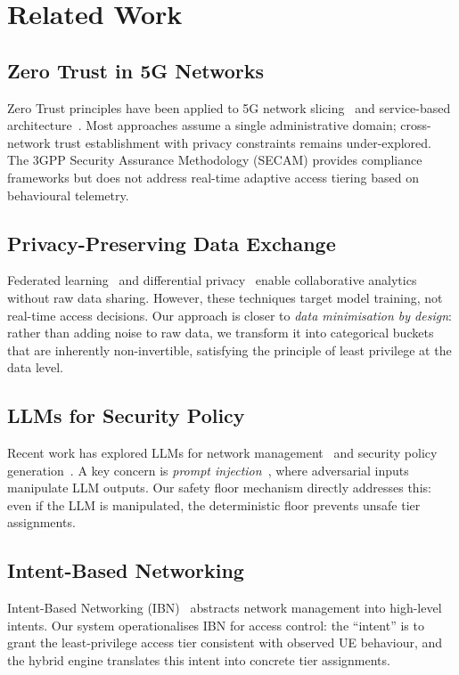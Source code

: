 \documentclass[conference]{IEEEtran}
\begin{document}
\section{Related Work}
\label{sec:related}

\subsection{Zero Trust in 5G Networks}
Zero Trust principles have been applied to 5G network slicing~\cite{benzaid2020ztasecurity} and service-based architecture~\cite{porambage2021roadmap}. Most approaches assume a single administrative domain; cross-network trust establishment with privacy constraints remains under-explored. The 3GPP Security Assurance Methodology (SECAM) provides compliance frameworks but does not address real-time adaptive access tiering based on behavioural telemetry.

\subsection{Privacy-Preserving Data Exchange}
Federated learning~\cite{mcmahan2017communication} and differential privacy~\cite{dwork2014algorithmic} enable collaborative analytics without raw data sharing. However, these techniques target model training, not real-time access decisions. Our approach is closer to \emph{data minimisation by design}: rather than adding noise to raw data, we transform it into categorical buckets that are inherently non-invertible, satisfying the principle of least privilege at the data level.

\subsection{LLMs for Security Policy}
Recent work has explored LLMs for network management~\cite{maatouk2024large} and security policy generation~\cite{chen2024llmsecurity}. A key concern is \emph{prompt injection}~\cite{greshake2023not}, where adversarial inputs manipulate LLM outputs. Our safety floor mechanism directly addresses this: even if the LLM is manipulated, the deterministic floor prevents unsafe tier assignments.

\subsection{Intent-Based Networking}
Intent-Based Networking (IBN)~\cite{clemm2020intent} abstracts network management into high-level intents. Our system operationalises IBN for access control: the ``intent'' is to grant the least-privilege access tier consistent with observed UE behaviour, and the hybrid engine translates this intent into concrete tier assignments.
\end{document}
